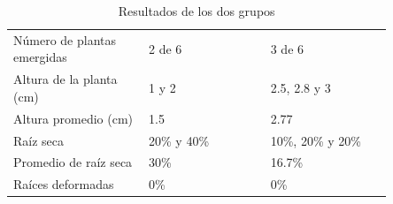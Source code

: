 \begin{table}[H]

\caption{Resultados de los dos grupos}
\label{tab:resultados_dos_grupos}

\begin{threeparttable}

{\centering\small{}
\begin{tabular}{M{0.3\linewidth}M{0.275\linewidth}M{0.275\linewidth}}\hline

     &  &  \\ \hline
    
    Número de plantas emergidas & 2 de 6       & 3 de 6 \\
    Altura de la planta (cm)    & 1 y 2        & 2.5, 2.8 y 3 \\
    Altura promedio (cm)        & 1.5          & 2.77 \\
    Raíz seca                   & 20\% y 40\%  & 10\%, 20\% y 20\% \\
    Promedio de raíz seca       & 30\%         & 16.7\% \\
    Raíces deformadas           & 0\%          & 0\% \\
    
    \hline
\end{tabular}}

\begin{tablenotes}\tiny %
    \item[] 
\end{tablenotes}

\end{threeparttable}
\end{table}